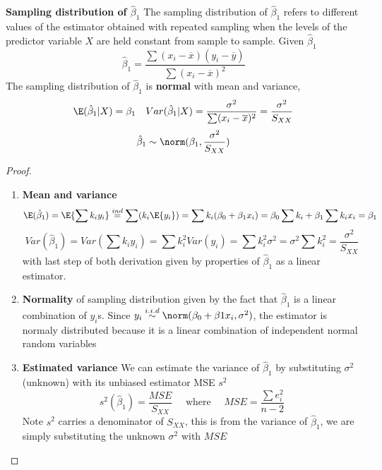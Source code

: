 \documentclass[11pt]{article}
\begin{document}
\begin{defn*}
    \textbf{Sampling distribution of $\hat{\beta}_1$} The sampling distribution of $\hat{\beta}_1$ refers to different values of the estimator obtained with repeated sampling when the levels of the predictor variable $X$ are held constant from sample to sample. Given $\hat{\beta}_1$ 
    \[
        \hat{\beta}_1 = \frac{\sum (x_i - \overline{x})(y_i - \overline{y})}{\sum (x_i - \overline{x})^2}
    \]
    The sampling distribution of $\hat{\beta}_1$ is \textbf{normal} with mean and variance,
    \[
        \E(\hat{\beta}_1 | X) = \beta_1 \quad Var(\hat{\beta}_1 | X) = \frac{\sigma^2}{\sum (x_i - \overline{x})^2} = \frac{\sigma^2}{S_{XX}}
    \]
    \[
        \hat{\beta}_1 \sim \norm(\beta_1, \frac{\sigma^2}{S_{XX}})
    \]
    \begin{proof}
        $ $\\
        \begin{enumerate}
            \item \textbf{Mean and variance}
            \[
                \E(\hat{\beta}_1) = \E\{ \sum k_i y_i \} \overset{ind}{=} \sum (k_i \E\{y_i \}) = \sum k_i(\beta_0 + \beta_1 x_i) = \beta_0 \sum k_i + \beta_1 \sum k_i x_i = \beta_1
            \]
            \[
                Var(\hat{\beta}_1) = Var\left( \sum k_i y_i \right) = \sum k_i^2 Var(y_i) = \sum k_i^2\sigma^2 = \sigma^2 \sum k_i^2 = \frac{\sigma^2}{S_{XX}}
            \]
            with last step of both derivation given by properties of $\hat{\beta}_1$ as a linear estimator. 
            \item \textbf{Normality} of sampling distribution given by the fact that $\hat{\beta}_1$ is a linear combination of $y_i$s. Since $y_i \overset{i.i.d}{\sim} \norm(\beta_0 + \beta1 x_i , \sigma^2)$, the estimator is normaly distributed because it is a linear combination of independent normal random variables
            \item \textbf{Estimated variance} We can estimate the variance of $\hat{\beta}_1$ by substituting $\sigma^2$ (unknown) with its unbiased estimator MSE $s^2$
            \[
                s^2 (\hat{\beta}_1) = \frac{MSE}{S_{XX}} \quad \text{ where } \quad MSE = \frac{\sum e_i^2}{n-2}
            \]
            Note $s^2$ carries a denominator of $S_{XX}$, this is from the variance of $\hat{\beta}_1$, we are simply substituting the unknown $\sigma^2$ with $MSE$
        \end{enumerate}
    \end{proof}
\end{defn*}
\end{document}
